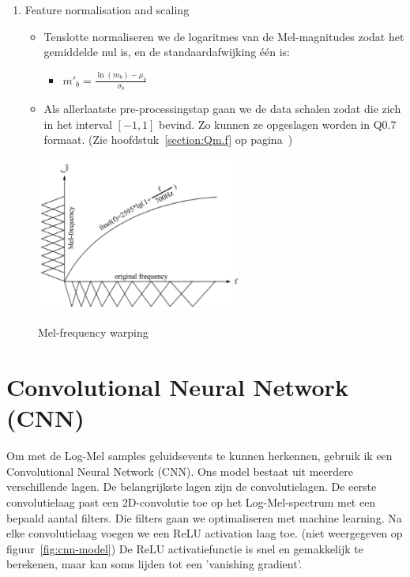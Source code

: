 \begin{no-awa}
\begin{enumerate}
	\item Feature normalisation and scaling
	      \begin{itemize}
		      \item Tenslotte normaliseren we de logaritmes van de Mel-magnitudes zodat het gemiddelde nul is, en de standaardafwijking één is:
		            \begin{itemize}[label={}]
			            \item \(m'_b = \frac{\ln\left( m_b \right) - \mu_b}{\sigma_b}\)
		            \end{itemize}
		      \item Als allerlaatste pre-processingstap gaan we de data schalen zodat die zich in het interval \(\left[ -1,1 \right]\) bevind. Zo kunnen ze opgeslagen worden in Q0.7 formaat. (Zie hoofdstuk~\ref{section:Qm.f} op pagina~\pageref{section:Qm.f})
	      \end{itemize}
\end{enumerate}
\end{no-awa}


\begin{figure}[ht]
	\centering
	\includegraphics[width=0.6\textwidth]{figuren/Mel-frequency.png}
	\caption{Mel-frequency warping}
	\cite{efficient-feature-extraction}
	\label{fig:Mel-bands}
\end{figure}


\section{Convolutional Neural Network (CNN)}

Om met de Log-Mel samples geluidsevents te kunnen herkennen, gebruik ik een Convolutional Neural Network (CNN). Ons model bestaat uit meerdere verschillende lagen. De belangrijkste lagen zijn de convolutielagen. De eerste convolutielaag past een 2D-convolutie toe op het Log-Mel-spectrum met een bepaald aantal filters. Die filters gaan we optimaliseren met machine learning.
Na elke convolutielaag voegen we een ReLU activation laag toe. (niet weergegeven op figuur~\ref{fig:cnn-model}) De ReLU activatiefunctie is snel en gemakkelijk te berekenen, \cite{enwiki:relu} maar kan soms lijden tot een 'vanishing gradient'. \cite{enwiki:vanishing-gradient}

